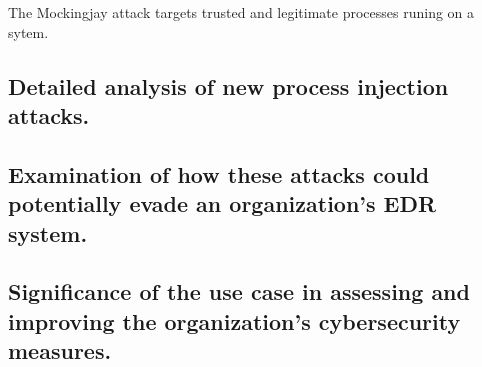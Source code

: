 \documentclass{article}
\begin{document}
The Mockingjay  attack targets trusted and legitimate processes runing on a sytem.  

\subsection{Detailed analysis of new process injection attacks.}

\subsection{Examination of how these attacks could potentially evade an organization's EDR system.}

\subsection{Significance of the use case in assessing and improving the organization's cybersecurity measures.}
\end{document}
